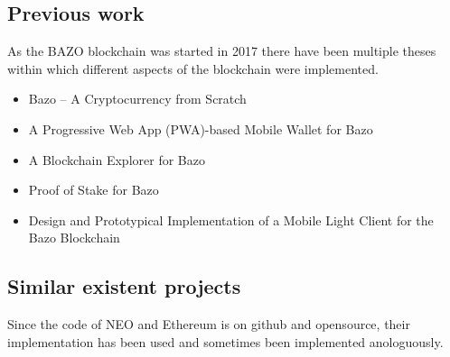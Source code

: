 \subsection{Previous work}
As the BAZO blockchain was started in 2017 there have been multiple theses within which different aspects of the blockchain were implemented. 
\begin{itemize}
	\item Bazo – A Cryptocurrency from Scratch \cite{ba_miner}
	\item A Progressive Web App (PWA)-based Mobile Wallet for Bazo \cite{ba_wallet}
	\item A Blockchain Explorer for Bazo \cite{ba_explorer}
	\item Proof of Stake for Bazo \cite{ba_pos}
	\item Design and Prototypical Implementation of a Mobile Light Client for the Bazo Blockchain \cite{ba_client}
\end{itemize}

\subsection{Similar existent projects}
Since the code of NEO and Ethereum is on github and opensource, their implementation has been used and sometimes been implemented anologuously. 

